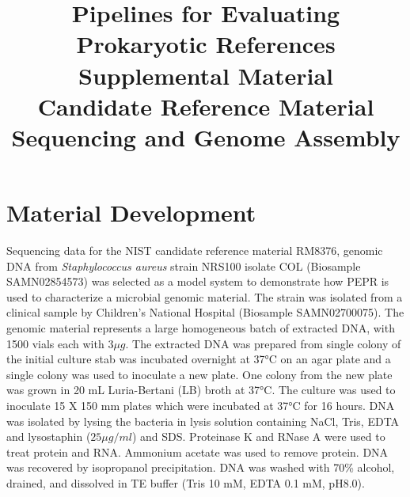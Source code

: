\documentclass{article}\usepackage[]{graphicx}\usepackage[]{color}
\begin{document}
\title{
        Pipelines for Evaluating Prokaryotic References \\ 
        \large{Supplemental Material}\\
        Candidate Reference Material Sequencing and Genome Assembly
}
\maketitle

\section{Material Development}
Sequencing data for the NIST candidate reference material RM8376, genomic DNA from \emph{Staphylococcus aureus} strain NRS100 isolate COL (Biosample SAMN02854573) was selected as a model system to demonstrate how PEPR is used to characterize a microbial genomic material.  The strain was isolated from a clinical sample by Children's National Hospital (Biosample SAMN02700075). The genomic material represents a large homogeneous batch of extracted DNA, with 1500 vials each with $3\mu g$.  The extracted DNA was prepared from single colony of the initial culture stab was incubated overnight at 37°C on an agar plate and a single colony was used to inoculate a new plate. One colony from the new plate was grown in 20 mL Luria-Bertani (LB) broth at 37°C. The culture was used to inoculate 15 X 150 mm plates which were incubated at 37°C for 16 hours. DNA was isolated by lysing the bacteria in lysis solution containing NaCl, Tris, EDTA and lysostaphin ($25\mu g/ml$) and SDS. Proteinase K and RNase A were used to treat protein and RNA. Ammonium acetate was used to remove protein. DNA was recovered by isopropanol precipitation. DNA was washed with 70\% alcohol, drained, and dissolved in TE buffer (Tris 10 mM, EDTA 0.1 mM, pH8.0).
\end{document}
